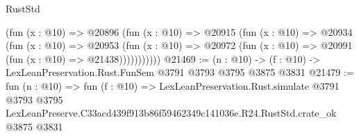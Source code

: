 \begin{lexlean}{RustStd}
\begin{coremodule}
            (fun (x : @10) =>
            @20896
              (fun (x : @10) =>
              @20915
                (fun (x : @10) =>
                @20934
                  (fun (x : @10) =>
                  @20953
                    (fun (x : @10) =>
                    @20972 (fun (x : @10) => @20991 (fun (x : @10) => @21438)))))))))))
@21469 := (n : @10) -> (f : @10) -> LexLeanPreservation.Rust.FunSem @3791 @3793 @3795 @3875 @3831
@21479 := fun (n : @10) =>
  fun (f : @10) =>
  LexLeanPreservation.Rust.simulate
    @3791
    @3793
    @3795
    LexLeanPreserve.C33acd439f913b86f59462349c141036e.R24.RustStd.crate_ok
    @3875
    @3831
\end{coremodule}
\end{lexlean}
